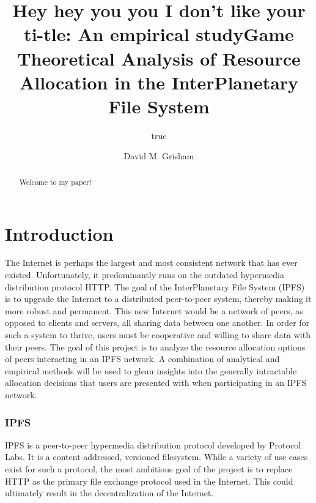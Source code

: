 \documentclass[12pt,letterpaper,]{article}
\title{Hey hey you you I don't like your ti-tle: An empirical study}
\author{true}
\date{}
\title{Game Theoretical Analysis of Resource Allocation in the InterPlanetary File System}
\author{David M. Grisham}
\begin{document}
\frontmatter

\maketitle
\newpage

\makecopyright{\the\year}
\newpage

\makesubmittal
\newpage

\begin{abstract}
Welcome to my paper!
\end{abstract}

\newpage



\hypersetup{linkcolor=black}
\setcounter{tocdepth}{2}
\tableofcontents

\listoffiguresandtables

\bodymatter

\hypertarget{introduction}{%
\chapter{Introduction}\label{introduction}}

The Internet is perhaps the largest and most consistent network that has
ever existed. Unfortunately, it predominantly runs on the outdated
hypermedia distribution protocol HTTP. The goal of the InterPlanetary
File System (IPFS) is to upgrade the Internet to a distributed
peer-to-peer system, thereby making it more robust and permanent. This
new Internet would be a network of peers, as opposed to clients and
servers, all sharing data between one another. In order for such a
system to thrive, users must be cooperative and willing to share data
with their peers. The goal of this project is to analyze the resource
allocation options of peers interacting in an IPFS network. A
combination of analytical and empirical methods will be used to glean
insights into the generally intractable allocation decisions that users
are presented with when participating in an IPFS network.

\hypertarget{ipfs}{%
\subsection{IPFS}\label{ipfs}}

IPFS is a peer-to-peer hypermedia distribution protocol developed by
Protocol Labs. It is a content-addressed, versioned filesystem. While a
variety of use cases exist for such a protocol, the most ambitious goal
of the project is to replace HTTP as the primary file exchange protocol
used in the Internet. This could ultimately result in the
decentralization of the Internet.
\end{document}
